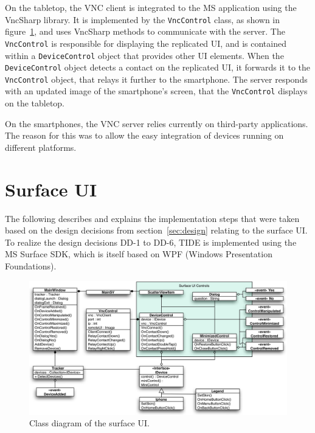 
On the tabletop, the VNC client is integrated to the MS application using the VncSharp library.
It is implemented by the \texttt{VncControl} class, as shown in figure~\ref{fig:surfaceDiagram}, and uses VncSharp methods to communicate with the server.
The \texttt{VncControl} is responsible for displaying the replicated UI, and is contained within a \texttt{DeviceControl} object that provides other UI elements.
When the \texttt{DeviceControl} object detects a contact on the replicated UI, it forwards it to the \texttt{VncControl} object, that relays it further to the smartphone.
The server responds with an updated image of the smartphone's screen, that the \texttt{VncControl} displays on the tabletop.

On the smartphones, the VNC server relies currently on third-party applications.
The reason for this was to allow the easy integration of devices running on different platforms.

\section{Surface UI}
\label{sec:surfaceui}

The following describes and explains the implementation steps that were taken based on the design decisions from section~\ref{sec:design} relating to the surface UI.
To realize the design decisions DD-1 to DD-6, TIDE is implemented using the MS Surface SDK, which is itself based on WPF (Windows Presentation Foundations).

\begin{figure}[htb]
  \centering
    \includegraphics[width=1\textwidth]{images/surfaceDiagram}
    \caption{Class diagram of the surface UI.}
    \label{fig:surfaceDiagram}
\end{figure}

